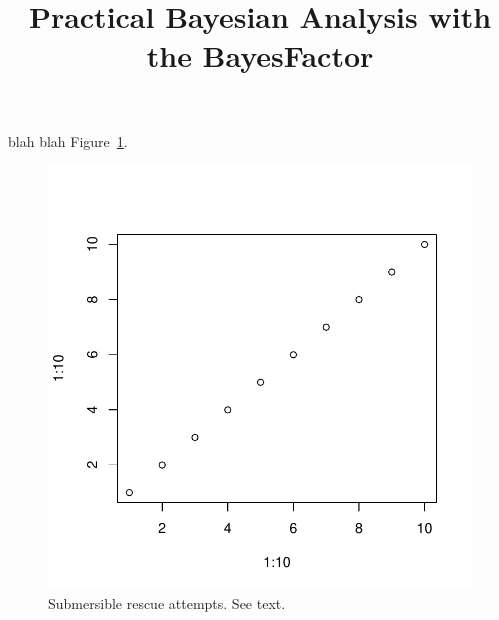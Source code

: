 \documentclass[jou,a4paper,floatsintext,draftfirst]{apa6}\usepackage[]{graphicx}\usepackage[]{color}
\title{Practical Bayesian Analysis with the BayesFactor}
\makeatletter
\def\maxwidth{ %
  \ifdim\Gin@nat@width>\linewidth
    \linewidth
  \else
    \Gin@nat@width
  \fi
}
\newenvironment{knitrout}{}{} %
\makeatother
\begin{document}
\maketitle





blah \citep{Rouder:etal:2012} blah Figure~\ref{fig:test1}.

\begin{knitrout}
\color{fgcolor}\begin{figure}
\includegraphics[width=\maxwidth]{figure/test1-1} \caption[Submersible rescue attempts]{Submersible rescue attempts. See text.\label{fig:test1}}
\end{figure}


\end{knitrout}




\printbibliography
\end{document}
